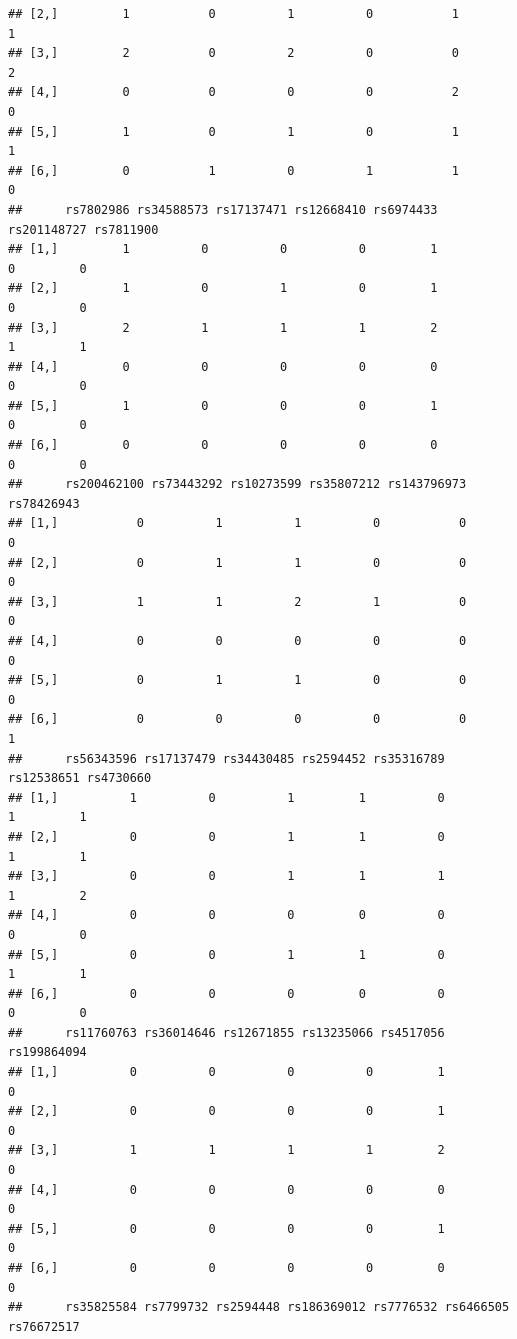 \documentclass[
]{article}
\begin{document}
\begin{verbatim}
## [2,]         1           0          1          0           1          1
## [3,]         2           0          2          0           0          2
## [4,]         0           0          0          0           2          0
## [5,]         1           0          1          0           1          1
## [6,]         0           1          0          1           1          0
##      rs7802986 rs34588573 rs17137471 rs12668410 rs6974433 rs201148727 rs7811900
## [1,]         1          0          0          0         1           0         0
## [2,]         1          0          1          0         1           0         0
## [3,]         2          1          1          1         2           1         1
## [4,]         0          0          0          0         0           0         0
## [5,]         1          0          0          0         1           0         0
## [6,]         0          0          0          0         0           0         0
##      rs200462100 rs73443292 rs10273599 rs35807212 rs143796973 rs78426943
## [1,]           0          1          1          0           0          0
## [2,]           0          1          1          0           0          0
## [3,]           1          1          2          1           0          0
## [4,]           0          0          0          0           0          0
## [5,]           0          1          1          0           0          0
## [6,]           0          0          0          0           0          1
##      rs56343596 rs17137479 rs34430485 rs2594452 rs35316789 rs12538651 rs4730660
## [1,]          1          0          1         1          0          1         1
## [2,]          0          0          1         1          0          1         1
## [3,]          0          0          1         1          1          1         2
## [4,]          0          0          0         0          0          0         0
## [5,]          0          0          1         1          0          1         1
## [6,]          0          0          0         0          0          0         0
##      rs11760763 rs36014646 rs12671855 rs13235066 rs4517056 rs199864094
## [1,]          0          0          0          0         1           0
## [2,]          0          0          0          0         1           0
## [3,]          1          1          1          1         2           0
## [4,]          0          0          0          0         0           0
## [5,]          0          0          0          0         1           0
## [6,]          0          0          0          0         0           0
##      rs35825584 rs7799732 rs2594448 rs186369012 rs7776532 rs6466505 rs76672517

\end{verbatim}
\end{document}
